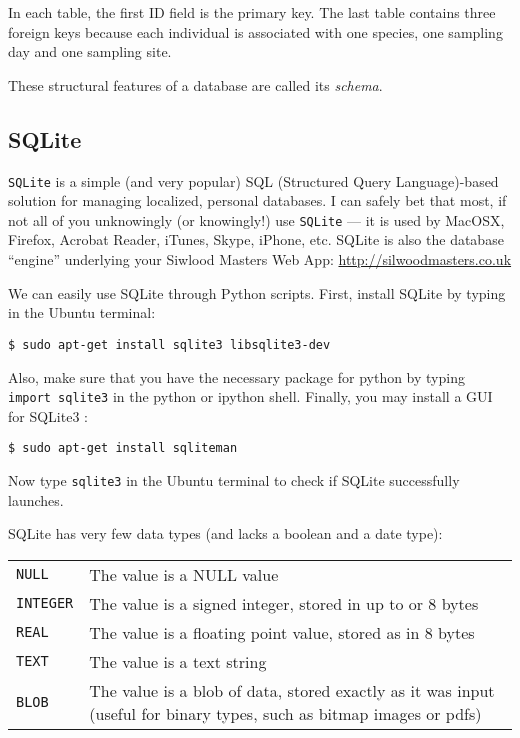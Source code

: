 In each table, the first ID field is the primary key. The last table 
contains three foreign keys because each individual is associated with 
one species, one sampling day and one sampling site. 

These structural features of a database are called its {\it schema}.

\subsection{SQLite}

{\tt SQLite} is a simple (and very popular) SQL (Structured Query 
Language)-based solution for managing localized, personal databases. I 
can safely bet that most, if not all of you unknowingly (or knowingly!) 
use {\tt SQLite}  --- it is used by MacOSX, Firefox, Acrobat Reader, 
iTunes, Skype, iPhone, etc. SQLite is also the database ``engine'' 
underlying your Siwlood Masters Web App: 
\url{http://silwoodmasters.co.uk}

We can easily use SQLite through Python scripts. First, install 
SQLite by typing in the Ubuntu terminal:
\begin{lstlisting}
$ sudo apt-get install sqlite3 libsqlite3-dev
\end{lstlisting}

Also, make sure that you have the necessary package for python by 
typing {\tt import sqlite3} in the python or ipython shell. Finally, 
you may install a GUI for SQLite3 :

\begin{lstlisting}
$ sudo apt-get install sqliteman
\end{lstlisting}

Now type {\tt sqlite3} in the Ubuntu terminal to check if SQLite 
successfully launches. 

SQLite has very few data types (and lacks a boolean and a date type):

\begin{tabular}{p{2cm} p{10cm}} 
	{\tt NULL} & The value is a NULL value\\
  {\tt INTEGER} & The value is a signed integer, stored in up to or 8
	bytes\\
  {\tt REAL} & The value is a floating point value, stored as in 8 
  bytes\\
  {\tt TEXT} & The value is a text string\\
  {\tt BLOB} & The value is a blob of data, stored exactly as it was
	input (useful for binary types, such as bitmap images or pdfs)\\
\end{tabular}\\

